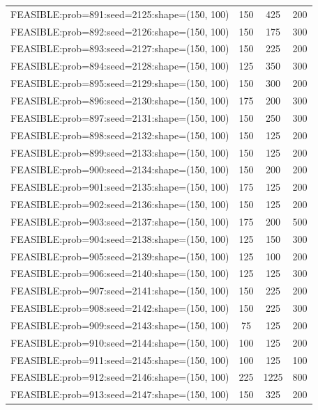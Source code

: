 \begin{longtable}{lccc}
FEASIBLE:prob=891:seed=2125:shape=(150, 100) &      150 &   425 &    200 \\
FEASIBLE:prob=892:seed=2126:shape=(150, 100) &      150 &   175 &    300 \\
FEASIBLE:prob=893:seed=2127:shape=(150, 100) &      150 &   225 &    200 \\
FEASIBLE:prob=894:seed=2128:shape=(150, 100) &      125 &   350 &    300 \\
FEASIBLE:prob=895:seed=2129:shape=(150, 100) &      150 &   300 &    200 \\
FEASIBLE:prob=896:seed=2130:shape=(150, 100) &      175 &   200 &    300 \\
FEASIBLE:prob=897:seed=2131:shape=(150, 100) &      150 &   250 &    300 \\
FEASIBLE:prob=898:seed=2132:shape=(150, 100) &      150 &   125 &    200 \\
FEASIBLE:prob=899:seed=2133:shape=(150, 100) &      150 &   125 &    200 \\
FEASIBLE:prob=900:seed=2134:shape=(150, 100) &      150 &   200 &    200 \\
FEASIBLE:prob=901:seed=2135:shape=(150, 100) &      175 &   125 &    200 \\
FEASIBLE:prob=902:seed=2136:shape=(150, 100) &      150 &   125 &    200 \\
FEASIBLE:prob=903:seed=2137:shape=(150, 100) &      175 &   200 &    500 \\
FEASIBLE:prob=904:seed=2138:shape=(150, 100) &      125 &   150 &    300 \\
FEASIBLE:prob=905:seed=2139:shape=(150, 100) &      125 &   100 &    200 \\
FEASIBLE:prob=906:seed=2140:shape=(150, 100) &      125 &   125 &    300 \\
FEASIBLE:prob=907:seed=2141:shape=(150, 100) &      150 &   225 &    200 \\
FEASIBLE:prob=908:seed=2142:shape=(150, 100) &      150 &   225 &    300 \\
FEASIBLE:prob=909:seed=2143:shape=(150, 100) &       75 &   125 &    200 \\
FEASIBLE:prob=910:seed=2144:shape=(150, 100) &      100 &   125 &    200 \\
FEASIBLE:prob=911:seed=2145:shape=(150, 100) &      100 &   125 &    100 \\
FEASIBLE:prob=912:seed=2146:shape=(150, 100) &      225 &  1225 &    800 \\
FEASIBLE:prob=913:seed=2147:shape=(150, 100) &      150 &   325 &    200 \\

\end{longtable}
